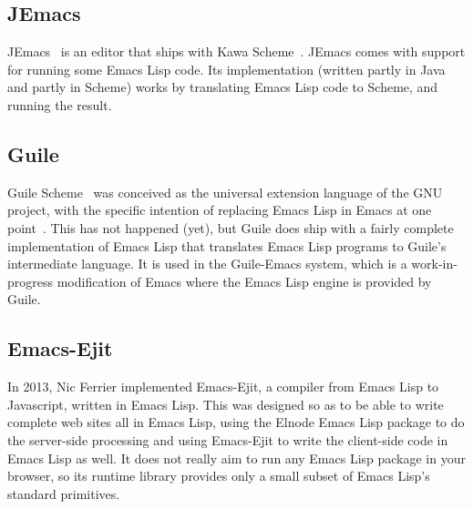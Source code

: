 \documentclass[format=acmsmall, review]{acmart}
\newcommand \Elisp {Emacs Lisp}
\begin{document}
\subsection{JEmacs}

JEmacs~\cite{Bothner2001} is an editor that ships with Kawa
Scheme~\cite{KawaScheme}.  JEmacs comes with support for running some
\Elisp{} code.  Its implementation (written partly in Java and
partly in Scheme) works by translating \Elisp{} code to Scheme, and
running the result.

\subsection{Guile}

Guile Scheme~\cite{Guile2020} was conceived as the universal extension
language of the GNU project, with the specific intention of replacing
\Elisp{} in Emacs at one point~\cite{WhyNotTcl}.  This has not happened (yet), but Guile does
ship with a fairly complete implementation of \Elisp{} that translates
\Elisp{} programs to Guile's intermediate language.  It is used in the
Guile-Emacs system, which is a work-in-progress modification of Emacs where
the \Elisp{} engine is provided by Guile.

\subsection{Emacs-Ejit}

In 2013, Nic Ferrier implemented Emacs-Ejit, a compiler from \Elisp{} to
Javascript, written in \Elisp{}.  This was designed so as to be able to write complete web sites
all in \Elisp{}, using the Elnode \Elisp{} package to do the server-side
processing and using Emacs-Ejit to write the client-side code in \Elisp{}
as well.  It does not really aim to run any \Elisp{} package in your
browser, so its runtime library provides only a small subset of \Elisp's
standard primitives.

\clearpage %



\end{document}
